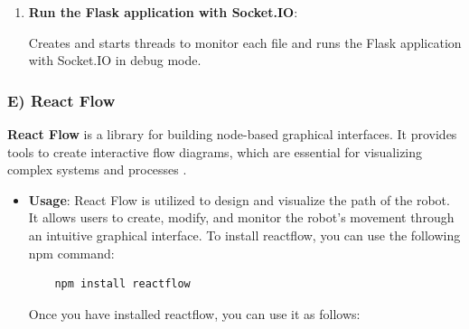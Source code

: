 \begin{itemize}
\begin{enumerate}
    \item \textbf{Run the Flask application with Socket.IO}:
    \vspace{2mm}
    
    \vspace{-2mm}
        Creates and starts threads to monitor each file and runs the Flask application with Socket.IO in debug mode.



\end{enumerate}


\end{itemize}


\subsubsection*{E) React Flow}
\vspace{-2mm}
\textbf{React Flow} is a library for building node-based graphical interfaces. It provides tools to create interactive flow diagrams, which are essential for visualizing complex systems and processes \cite{reactflow} \cite{reactflow-examples}.

\begin{itemize}
    \item \textbf{Usage}: React Flow is utilized to design and visualize the path of the robot. It allows users to create, modify, and monitor the robot's movement through an intuitive graphical interface. To install reactflow, you can use the following
npm command:

\newpage
            \begin{verbatim}
    npm install reactflow
    \end{verbatim}
    \vspace{-3mm}
    Once you have installed reactflow, you can use it as follows:
\vspace{2mm}
    
\end{itemize}

